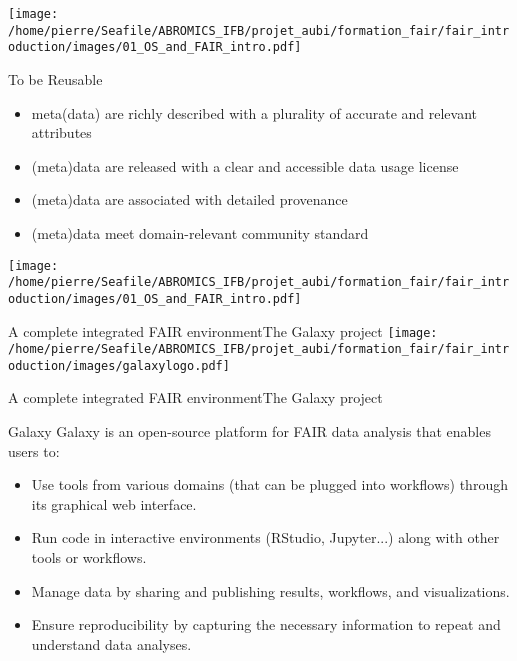 \begin{frame}
\texttt{[image: /home/pierre/Seafile/ABROMICS\_IFB/projet\_aubi/formation\_fair/fair\_introduction/images/01\_OS\_and\_FAIR\_intro.pdf]}
\end{frame}

\begin{frame}
\begin{block}{To be Reusable}
\begin{itemize}
\item meta(data) are richly described with a plurality of accurate and relevant attributes
\item (meta)data are released with a clear and accessible data usage license
\item (meta)data are associated with detailed provenance
\item (meta)data meet domain-relevant community standard
\end{itemize}
\end{block}
\end{frame}

\begin{frame}
\centering\texttt{[image: /home/pierre/Seafile/ABROMICS\_IFB/projet\_aubi/formation\_fair/fair\_introduction/images/01\_OS\_and\_FAIR\_intro.pdf]}
\end{frame}


\begin{frame}{A complete integrated FAIR environment}{The Galaxy project}
\centering\texttt{[image: /home/pierre/Seafile/ABROMICS\_IFB/projet\_aubi/formation\_fair/fair\_introduction/images/galaxylogo.pdf]}
\end{frame}

\begin{frame}{A complete integrated FAIR environment}{The Galaxy project}
\begin{block}{Galaxy}
Galaxy is an open-source platform for FAIR data analysis that enables users to:
\begin{itemize}
\item Use tools from various domains (that can be plugged into workflows) through its graphical web interface.
\item Run code in interactive environments (RStudio, Jupyter...) along with other tools or workflows.
\item Manage data by sharing and publishing results, workflows, and visualizations.
\item Ensure reproducibility by capturing the necessary information to repeat and understand data analyses.
\end{itemize}
\end{block}
\end{frame}


